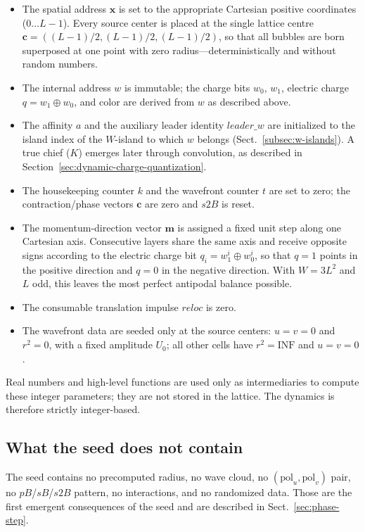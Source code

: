 \documentclass{ijuc}
\begin{document}
\begin{itemize}
  \item The spatial address $\boldsymbol{x}$ is set to the appropriate Cartesian positive coordinates ($0\ldots L-1$).  Every source center is placed at the single lattice centre $\mathbf{c}=((L-1)/2,(L-1)/2,(L-1)/2)$, so that all bubbles are born superposed at one point with zero radius---deterministically and without random numbers.
  \item The internal address $w$ is immutable; the charge bits $w_{0}$, $w_{1}$, electric charge $q=w_{1}\oplus w_{0}$, and color are derived from $w$ as described above.
  \item The affinity $a$ and the auxiliary leader identity $\mathit{leader\_w}$ are initialized to the island index of the $W$-island to which $w$ belongs (Sect.~\ref{subsec:w-islands}).  A true chief ($K$) emerges later through convolution, as described in Section~\ref{sec:dynamic-charge-quantization}.
  \item The housekeeping counter $k$ and the wavefront counter $t$ are set to zero; the contraction/phase vectors $\mathbf{c}$ are zero and $s2B$ is reset.
  \item The momentum-direction vector $\boldsymbol{m}$ is assigned a fixed unit step along one Cartesian axis.  Consecutive layers share the same axis and receive opposite signs according to the electric charge bit $q_{i}=w_{1}^{i}\oplus w_{0}^{i}$, so that $q=1$ points in the positive direction and $q=0$ in the negative direction.  With $W=3L^{2}$ and $L$ odd, this leaves the most perfect antipodal balance possible.
  \item The consumable translation impulse $\mathit{reloc}$ is zero.
  \item The wavefront data are seeded only at the source centers: $u=v=0$ and $r^{2}=0$, with a fixed amplitude $U_{0}$; all other cells have $r^{2}=\mathrm{INF}$ and $u=v=0$.
\end{itemize}

Real numbers and high-level functions are used only as intermediaries to compute these integer parameters; they are not stored in the lattice.  The dynamics is therefore strictly integer-based.

\subsection{What the seed does not contain}

The seed contains no precomputed radius, no wave cloud, no $(\mathrm{pol}_u,\mathrm{pol}_v)$ pair, no $pB$/$sB$/$s2B$ pattern, no interactions, and no randomized data.  Those are the first emergent consequences of the seed and are described in Sect.~\ref{sec:phase-step}.
\end{document}
